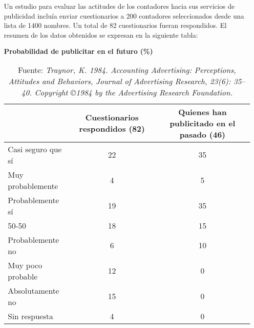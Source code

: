 
\addpoints

\question[60] Un estudio para evaluar las actitudes de los contadores hacia sus servicios de publicidad incluía enviar cuestionarios a 200 contadores seleccionados desde una lista de 1400 nombres. Un total de 82 cuestionarios fueran respondidos. El resumen de los datos obtenidos se expresan en la siguiente tabla:\\




\begin{table}[h!]
\textbf{Probabilidad de publicitar en el futuro (\%)}
\centering
\begin{tabular}{lcc}
\hline
                   & Cuestionarios respondidos (82) & Quienes han publicitado en el pasado (46) \\ \hline
Casi seguro que sí & 22                        & 35                                            \\
Muy probablemente  & 4                         & 5                                             \\
Probablemente sí   & 19                        & 35                                            \\
50-50              & 18                        & 15                                            \\
Probablemente no   & 6                         & 10                                            \\
Muy poco probable  & 12                        & 0                                             \\
Absolutamente no   & 15                        & 0                                             \\
Sin respuesta      & 4                         & 0                                             \\ \hline
\end{tabular}
\caption{Fuente: \textit{Traynor, K. 1984. Accounting Advertising: Perceptions, Attitudes and Behaviors, Journal of Advertising Research, 23(6): 35–40. Copyright ©1984 by the Advertising Research Foundation.}}
\end{table}

